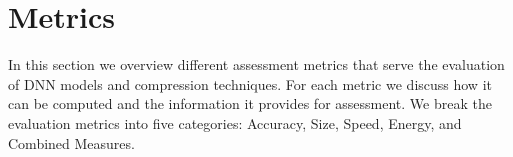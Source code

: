 










\section{Metrics}\label{sec:metrics}
In this section we overview different assessment metrics that serve the evaluation of DNN models and compression techniques. For each metric we discuss how it can be computed and the information it provides for assessment. We break the evaluation metrics into five categories: Accuracy, Size, Speed, Energy, and Combined Measures.%


